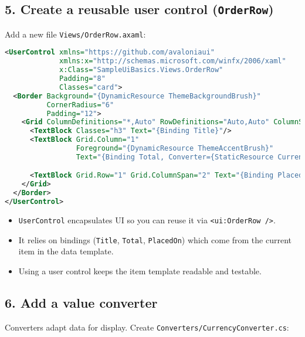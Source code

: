 \subsection{\texorpdfstring{5. Create a reusable user control
(\texttt{OrderRow})}{5. Create a reusable user control (OrderRow)}}\label{create-a-reusable-user-control-orderrow}

Add a new file \passthrough{\lstinline!Views/OrderRow.axaml!}:

\begin{lstlisting}[language=XML]
<UserControl xmlns="https://github.com/avaloniaui"
             xmlns:x="http://schemas.microsoft.com/winfx/2006/xaml"
             x:Class="SampleUiBasics.Views.OrderRow"
             Padding="8"
             Classes="card">
  <Border Background="{DynamicResource ThemeBackgroundBrush}"
          CornerRadius="6"
          Padding="12">
    <Grid ColumnDefinitions="*,Auto" RowDefinitions="Auto,Auto" ColumnSpacing="12">
      <TextBlock Classes="h3" Text="{Binding Title}"/>
      <TextBlock Grid.Column="1"
                 Foreground="{DynamicResource ThemeAccentBrush}"
                 Text="{Binding Total, Converter={StaticResource CurrencyConverter}}"/>

      <TextBlock Grid.Row="1" Grid.ColumnSpan="2" Text="{Binding PlacedOn, StringFormat='Ordered on {0:d}'}"/>
    </Grid>
  </Border>
</UserControl>
\end{lstlisting}

\begin{itemize}
\tightlist
\item
  \passthrough{\lstinline!UserControl!} encapsulates UI so you can reuse
  it via \passthrough{\lstinline!<ui:OrderRow />!}.
\item
  It relies on bindings (\passthrough{\lstinline!Title!},
  \passthrough{\lstinline!Total!}, \passthrough{\lstinline!PlacedOn!})
  which come from the current item in the data template.
\item
  Using a user control keeps the item template readable and testable.
\end{itemize}

\subsection{6. Add a value converter}\label{add-a-value-converter}

Converters adapt data for display. Create
\passthrough{\lstinline!Converters/CurrencyConverter.cs!}:

